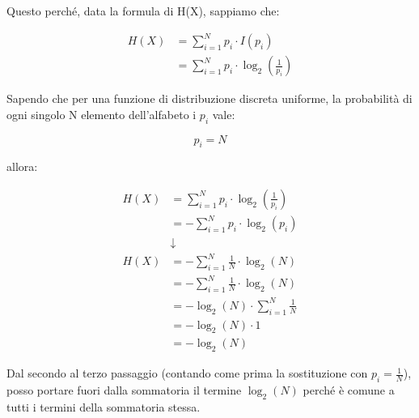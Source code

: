 Questo perché, data la formula di H(X), sappiamo che: 

{
    \Large 
    \begin{equation}
        \begin{split}
            H(X) &= 
            \sum_{i = 1}^{N} 
            p_i \cdot I(p_i)
            \\
            &= 
            \sum_{i = 1}^{N}
            p_i \cdot \log_{2} \left(\frac{1}{p_i} \right) 
        \end{split}
    \end{equation}
}

Sapendo che per una funzione di distribuzione discreta uniforme, la probabilità di ogni singolo N elemento dell'alfabeto i $p_i$ vale: 

{
    \Large 
    \begin{equation}
        p_i = N
    \end{equation}
} 

allora: 

{
    \Large 
    \begin{equation}
        \begin{split}
        H (X)
        &= 
        \sum_{i = 1}^{N}
        p_i \cdot \log_{2} \left(\frac{1}{p_i} \right) 
        \\
        &= 
        -
        \sum_{i = 1}^{N}
        p_i \cdot \log_{2} \left(p_i \right) 
        \\
        &\downarrow
        \\
        H(X)
        &=
        -  
        \sum_{i = 1}^{N}
        \frac{1}{N} \cdot \log_{2} \left( N \right)
        \\
        &= 
        -
        \sum_{i = 1}^{N}
        \frac{1}{N} \cdot \log_{2} \left( N\right)
        \\
        &=
        - 
        \log_{2} \left( N\right)
        \cdot 
        \sum_{i = 1}^{N}
        \frac{1}{N}
        \\
        &=
        -
        \log_{2} \left( N\right)
        \cdot 
        1 
        \\
        &=
        - 
        \log_{2} \left( N\right)
        \end{split} 
    \end{equation}
}

Dal secondo al terzo passaggio (contando come prima la sostituzione con $p_i = \frac{1}{N}$), 
posso portare fuori dalla sommatoria il termine $\log_{2} \left( N\right)$ perché è comune a tutti i termini della sommatoria stessa. \newline 

